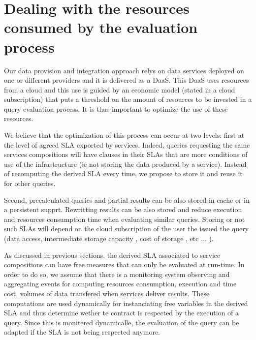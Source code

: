  
\section{Dealing with the resources consumed by the evaluation process}
\label{sec:queryProcessOpt}
  
 
 Our data provision and integration approach relys on data services deployed on one or different providers and it is delivered as a DaaS. This DaaS  uses resources from a cloud and this use  is  guided by an economic model (stated in a cloud subscription) that puts a threshold on the amount of resources to be invested in a query evaluation process. It is thus important to optimize the use of these resources.
 
 We believe that the optimization of this process can occur at two levels: first at the level of agreed SLA exported by services.  Indeed, queries requesting the same services compositions will have clauses in their SLAs that are more conditions of use of the infrastructure (ie not storing the data produced by a service). Instead of recomputing the derived SLA every time, we propose to store it and reuse it for other queries. 
 
Second, precalculated queries and partial results can be also stored in cache or in a persistent supprt. Rewritting results can be also stored and reduce execution and resources consumption time when evaluating similar queries. Storing or not such SLAs will depend on the cloud subscription of the user the issued the query (data access, intermediate storage capacity , cost of storage , etc ... ).

As discussed in previous sections, the derived SLA associated to service compositions can have free measures that can only be evaluated at run-time. In order to do so, we assume that there is a monitoring system observing and aggregating events for computing resources consumption, execution and time cost, volumes of data transfered when services deliver results. These computations are used dynamically for instanciating free variables in the derived SLA and thus determine wether te contract is respected by the execution of a query. Since this is monitered dynamicalle, the evaluation of the query can be adapted if the SLA is not being respected anymore.


